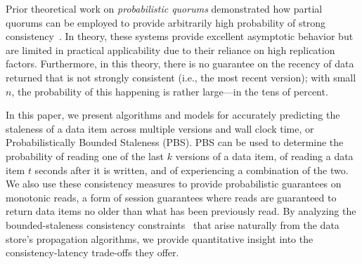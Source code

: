 \documentclass{vldb}
\begin{document}

Prior theoretical work on \textit{probabilistic quorums} demonstrated
how partial quorums can be employed to provide arbitrarily high
probability of strong consistency~\cite{prob-quorum}. In theory, these
systems provide excellent asymptotic behavior but are limited in
practical applicability due to their reliance on high replication
factors.  Furthermore, in this theory, there is no guarantee on the
recency of data returned that is not strongly consistent (i.e., the
most recent version); with small $n$, the probability of this
happening is rather large---in the tens of percent.

In this paper, we present algorithms and models for accurately
predicting the staleness of a data item across multiple versions and
wall clock time, or Probabilistically Bounded Staleness (PBS). PBS
can be used to determine the probability of reading one of the last
$k$ versions of a data item, of reading a data item $t$ seconds after
it is written, and of experiencing a combination of the two.  We also
use these consistency measures to provide probabilistic guarantees on
monotonic reads, a form of session guarantees where reads are
guaranteed to return data items no older than what has been previously
read.  By analyzing the bounded-staleness consistency
constraints~\cite{vahdat-bounded} that arise naturally from the data store's
propagation algorithms, we provide quantitative insight into the
consistency-latency trade-offs they offer.
\end{document}
